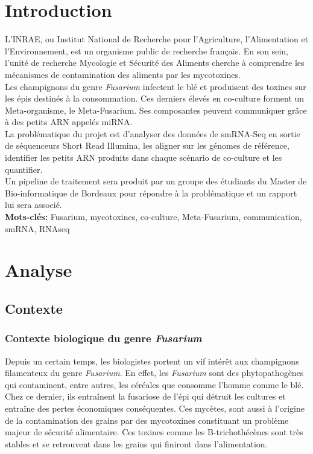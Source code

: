 \documentclass{report}
\begin{document}
\tableofcontents

\newpage

\chapter{Introduction}

L'INRAE, ou Institut National de Recherche pour l'Agriculture, l'Alimentation et l'Environnement, est un organisme public de recherche français. En son sein,  l’unité de recherche Mycologie et Sécurité des Aliments cherche à comprendre les mécanismes de contamination des aliments par les mycotoxines. \cite{inrae} \\

Les champignons du genre \textit{Fusarium} infectent le blé et produisent des toxines sur les épis destinés à la consommation. Ces derniers élevés en co-culture forment un Meta-organisme, le Meta-Fusarium. Ses composantes peuvent communiquer grâce à des petits ARN appelés miRNA. \\

La problématique du projet est d’analyser des données de smRNA-Seq en sortie de séquenceurs Short Read Illumina, les aligner sur les génomes de référence, identifier les petits ARN produits dans chaque scénario de co-culture et les quantifier.\\

Un pipeline de traitement sera produit par un groupe des étudiants du Master de Bio-informatique de Bordeaux pour répondre à la problématique et un rapport lui sera associé. \\

{\bf Mots-clés:} Fusarium, mycotoxines, co-culture, Meta-Fusarium, communication, smRNA, RNAseq

\chapter{Analyse}

\section{Contexte}

\subsection{Contexte biologique du genre \textit{Fusarium}}
Depuis un certain temps, les biologistes portent un vif intérêt aux champignons filamenteux du genre \textit{Fusarium}. En effet, les \textit{Fusarium} sont des phytopathogènes qui contaminent, entre autres, les céréales que consomme l’homme comme le blé. Chez ce dernier, ils entraînent la fusariose de l'épi qui détruit les cultures et entraîne des pertes économiques conséquentes. Ces mycètes, sont aussi à l’origine de la contamination des grains par des mycotoxines constituant un problème majeur de sécurité alimentaire. Ces toxines comme les B-trichothécènes sont très stables et se retrouvent dans les grains qui finiront dans l’alimentation.\\
\end{document}
